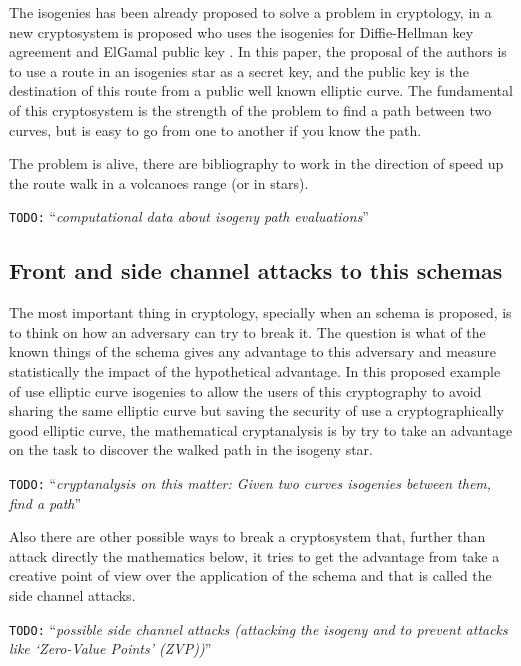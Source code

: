 \documentclass[10pt,a4paper,twoside]{llncs}
\newcommand{\todo}[1]{\texttt{\color{red}TODO:} ``\emph{#1}''}
\begin{document}
The isogenies has been already proposed to solve a problem in cryptology, in \cite{Rostovtsev06public} a new cryptosystem is proposed who uses the isogenies for Diffie-Hellman key agreement \cite{Diffie76newdirections} and ElGamal public key \cite{ElGamal85pkdlp}. In this paper, the proposal of the authors is to use a route in an isogenies star as a secret key, and the public key is the destination of this route from a public well known elliptic curve. The fundamental of this cryptosystem is the strength of the problem to find a path between two curves, but is easy to go from one to another if you know the path.

The problem is alive, there are bibliography \cite{SubExpIso} to work in the direction of speed up the route walk in a volcanoes range (or in stars). 

\todo{computational data about isogeny path evaluations}

\subsection{Front and side channel attacks to this schemas \label{sec:cryptanalysis}}

The most important thing in cryptology, specially when an schema is proposed, is to think on how an adversary can try to break it. The question is what of the known things of the schema gives any advantage to this adversary and measure statistically the impact of the hypothetical advantage. In this proposed example of use elliptic curve isogenies to allow the users of this cryptography to avoid sharing the same elliptic curve but saving the security of use a cryptographically good elliptic curve, the mathematical cryptanalysis is by try to take an advantage on the task to discover the walked path in the isogeny star.

\todo{cryptanalysis on this matter: Given two curves isogenies between them, find a path}\cite{FastBetweenIso}

Also there are other possible ways to break a cryptosystem that, further than attack directly the mathematics below, it tries to get the advantage from take a creative point of view over the application of the schema and that is called the side channel attacks.

\todo{possible side channel attacks (attacking the isogeny and to prevent attacks like `\emph{Zero-Value Points}' (ZVP))}
\end{document}

